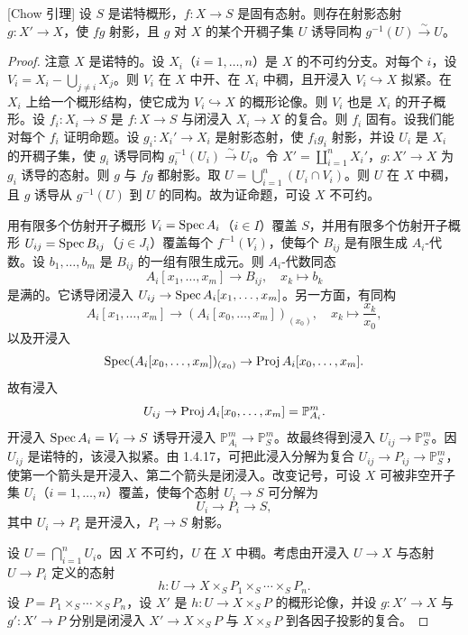\begin{proposition}\label{it:1.4.18}[Chow 引理]
设 $S$ 是诺特概形，$f\colon X\to S$ 是固有态射。则存在射影态射 $g\colon X'\to X$，使 $fg$ 射影，且 $g$ 对 $X$ 的某个开稠子集 $U$ 诱导同构 $g^{-1}(U)\xrightarrow{\sim}U$。
\end{proposition}

\begin{proof}
注意 $X$ 是诺特的。设 $X_i$（$i=1,\dots,n$）是 $X$ 的不可约分支。对每个 $i$，设 $V_i=X_i-\bigcup_{j\ne i}X_j$。则 $V_i$ 在 $X$ 中开、在 $X_i$ 中稠，且开浸入 $V_i\hookrightarrow X$ 拟紧。在 $X_i$ 上给一个概形结构，使它成为 $V_i\hookrightarrow X$ 的概形论像。则 $V_i$ 也是 $X_i$ 的开子概形。设 $f_i\colon X_i\to S$ 是 $f\colon X\to S$ 与闭浸入 $X_i\to X$ 的复合。则 $f_i$ 固有。设我们能对每个 $f_i$ 证明命题。设 $g_i\colon X_i'\to X_i$ 是射影态射，使 $f_ig_i$ 射影，并设 $U_i$ 是 $X_i$ 的开稠子集，使 $g_i$ 诱导同构 $g_i^{-1}(U_i)\xrightarrow{\sim}U_i$。令 $X'=\coprod_{i=1}^n X_i'$，$g\colon X'\to X$ 为 $g_i$ 诱导的态射。则 $g$ 与 $fg$ 都射影。取 $U=\bigcup_{i=1}^n(U_i\cap V_i)$。则 $U$ 在 $X$ 中稠，且 $g$ 诱导从 $g^{-1}(U)$ 到 $U$ 的同构。故为证命题，可设 $X$ 不可约。

用有限多个仿射开子概形 $V_i=\operatorname{Spec} A_i$（$i\in I$）覆盖 $S$，并用有限多个仿射开子概形 $U_{ij}=\operatorname{Spec} B_{ij}$（$j\in J_i$）覆盖每个 $f^{-1}(V_i)$，使每个 $B_{ij}$ 是有限生成 $A_i$-代数。设 $b_1,\dots,b_m$ 是 $B_{ij}$ 的一组有限生成元。则 $A_i$-代数同态
\[
A_i[x_1,\dots,x_m]\to B_{ij},\quad x_k\mapsto b_k
\]
是满的。它诱导闭浸入 $U_{ij}\to\operatorname{Spec} A_i[x_1,\dots,x_m]$。另一方面，有同构
\[
A_i[x_1,\dots,x_m]\to(A_i[x_0,\dots,x_m])_{(x_0)},\quad x_k\mapsto\frac{x_k}{x_0},
\]
以及开浸入
\[
\operatorname{Spec} (A_i[x_0,\dots,x_m])_{(x_0)}\to\operatorname{Proj} A_i[x_0,\dots,x_m].
\]
故有浸入
\[
U_{ij}\to\operatorname{Proj} A_i[x_0,\dots,x_m]=\mathbb{P}_{A_i}^m.
\]
开浸入 $\operatorname{Spec} A_i=V_i\to S$ 诱导开浸入 $\mathbb{P}_{A_i}^m\to\mathbb{P}_S^m$。故最终得到浸入 $U_{ij}\to\mathbb{P}_S^m$。因 $U_{ij}$ 是诺特的，该浸入拟紧。由 1.4.17，可把此浸入分解为复合 $U_{ij}\to P_{ij}\to\mathbb{P}_S^m$，使第一个箭头是开浸入、第二个箭头是闭浸入。改变记号，可设 $X$ 可被非空开子集 $U_i$（$i=1,\dots,n$）覆盖，使每个态射 $U_i\to S$ 可分解为
\[
U_i\to P_i\to S,
\]
其中 $U_i\to P_i$ 是开浸入，$P_i\to S$ 射影。

设 $U=\bigcap_{i=1}^n U_i$。因 $X$ 不可约，$U$ 在 $X$ 中稠。考虑由开浸入 $U\to X$ 与态射 $U\to P_i$ 定义的态射
\[
h\colon U\to X\times_S P_1\times_S\cdots\times_S P_n.
\]
设 $P=P_1\times_S\cdots\times_S P_n$，设 $X'$ 是 $h\colon U\to X\times_S P$ 的概形论像，并设 $g\colon X'\to X$ 与 $g'\colon X'\to P$ 分别是闭浸入 $X'\to X\times_S P$ 与 $X\times_S P$ 到各因子投影的复合。


\end{proof}
